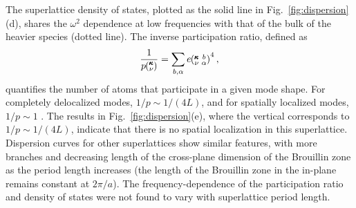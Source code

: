 The superlattice density of states, plotted as the solid line in Fig.~\ref{fig:dispersion}(d), shares the $\omega^2$ dependence at low frequencies with that of the bulk of the heavier species (dotted line). The inverse participation ratio, defined as 
\begin{equation}\label{EQ:P_ratio}
\begin{split}
\frac{1}{p\mspace{-4.0mu}\left(\mspace{-8.0mu} \begin{smallmatrix}&\pmb{\kappa} \\&\nu\end{smallmatrix} \mspace{-3.0mu}\right)}=\sum_{b,\alpha}e\mspace{-4.0mu}\left(\mspace{-8.0mu} \begin{smallmatrix} &\pmb{\kappa} &b \\ &\nu &\alpha\end{smallmatrix} \mspace{-3.0mu}\right)^4,
\end{split}
\end{equation}
quantifies the number of atoms that participate in a given mode shape. For completely delocalized modes, $1/p\sim 1/(4L)$, and for spatially localized modes, $1/p\sim 1$ \cite{PhysRevB.70.235214}. The results in Fig.~\ref{fig:dispersion}(e), where the vertical corresponds to $1/p\sim 1/(4L)$, indicate that there is no spatial localization in this superlattice.  Dispersion curves for other superlattices show similar features, with more branches and decreasing length of the cross-plane dimension of the Brouillin zone as the period length increases (the length of the Brouillin zone in the in-plane remains constant at $2\pi/a$). The frequency-dependence of the participation ratio and density of states were not found to vary with superlattice period length.
\renewcommand{\topfraction}{0.7}
\begin{figure*}%
\begin{center}
\renewcommand{\figure}{Fig.}
\caption{(a,b,c) Dispersion, (d) density of states and (e) inverse participation ratio for a $4\times4$ superlattice. Labeled gray squares represent select modes for Fig.~\ref{fig:sed}. X-$\Gamma$ corresponds to wavevectors along the CP ([1,0,0]) direction, $\Gamma$-A corresponds to wavevectors along the [1,1,1] direction and Z-$\Gamma$ corresponds to wavevectors along the IP ([0,1,0]) direction. Orange lines correspond the bulk of the lighter species and green lines correspond to the bulk of the heavier species.}
\label{fig:dispersion}
\end{center}
\end{figure*}

